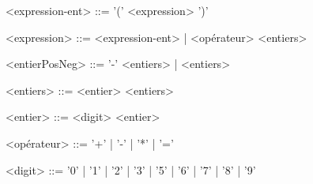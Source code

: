 	\begin{grammar}%
		
		<expression-ent> ::= '(' <expression> ')'
		
		<expression> ::= <expression-ent> | <opérateur> <entiers>
		
		<entierPosNeg> ::= '-' <entiers> | <entiers>
		
		<entiers> ::= <entier> <entiers>
		
		<entier> ::= <digit> <entier>
		
		<opérateur> ::= '+' | '-' | '*' | '=' 
		
		<digit> ::= '0' | '1' | '2' | '3' | '5' | '6' | '7' | '8' | '9'
		
		
	\end{grammar}